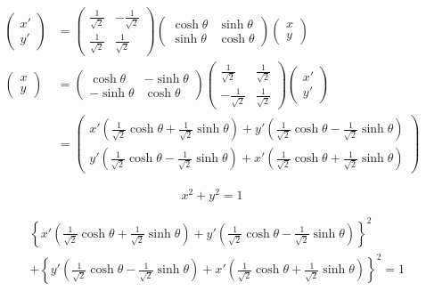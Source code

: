 \documentclass{thesis-SJ}
\begin{document}
\begin{align*}
\begin{pmatrix}
x' \\ y'
\end{pmatrix} &= \begin{pmatrix}\frac{1}{\sqrt{2}} & -\frac{1}{\sqrt{2}} \\ \frac{1}{\sqrt{2}} & \frac{1}{\sqrt{2}}\end{pmatrix} \begin{pmatrix}\cosh{\theta} & \sinh{\theta} \\ \sinh{\theta} & \cosh{\theta} \end{pmatrix} \begin{pmatrix}
x \\ y
\end{pmatrix} \\
\begin{pmatrix}
x \\ y
\end{pmatrix} &=
\begin{pmatrix}
\cosh{\theta} & -\sinh{\theta} \\ -\sinh{\theta} & \cosh{\theta}
\end{pmatrix} \begin{pmatrix}\frac{1}{\sqrt{2}} & \frac{1}{\sqrt{2}} \\ -\frac{1}{\sqrt{2}} &\frac{1}{\sqrt{2}} \end{pmatrix} \begin{pmatrix}
x' \\ y'
\end{pmatrix} \\
&= \begin{pmatrix}
x'\left(\frac{1}{\sqrt{2}}\cosh\theta +\frac{1}{\sqrt{2}}\sinh\theta\right)+y'\left(\frac{1}{\sqrt{2}}\cosh\theta -\frac{1}{\sqrt{2}}\sinh\theta\right)\\ y'\left(\frac{1}{\sqrt{2}}\cosh\theta -\frac{1}{\sqrt{2}}\sinh\theta\right)+x'\left(\frac{1}{\sqrt{2}}\cosh\theta +\frac{1}{\sqrt{2}}\sinh\theta\right)
\end{pmatrix}
\end{align*}

\[x^2+y^2=1\]

\begin{align*}
&\left\{x'\left(\frac{1}{\sqrt{2}}\cosh\theta +\frac{1}{\sqrt{2}}\sinh\theta\right)+y'\left(\frac{1}{\sqrt{2}}\cosh\theta -\frac{1}{\sqrt{2}}\sinh\theta\right)\right\}^2\\
&+\left\{y'\left(\frac{1}{\sqrt{2}}\cosh\theta -\frac{1}{\sqrt{2}}\sinh\theta\right)+x'\left(\frac{1}{\sqrt{2}}\cosh\theta +\frac{1}{\sqrt{2}}\sinh\theta\right)\right\}^2=1
\end{align*}
\end{document}
